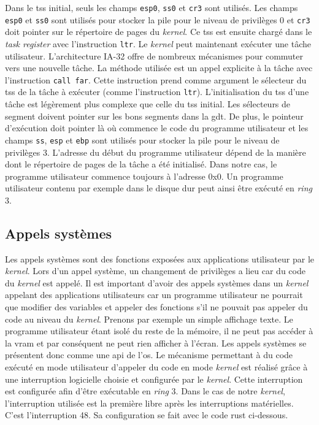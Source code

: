 Dans le \acrshort{tss} initial, seuls les champs \texttt{esp0},
\texttt{ss0} et \texttt{cr3} sont utilisés. Les champs
\texttt{esp0} et \texttt{ss0} sont utilisés pour stocker
la pile pour le niveau de privilèges 0 et \texttt{cr3} doit pointer
sur le répertoire de pages du \textit{kernel}. Ce \acrshort{tss} est ensuite chargé
dans le \textit{task register} avec l'instruction \texttt{ltr}. Le
\textit{kernel} peut maintenant exécuter une tâche utilisateur. L'architecture
\acrshort{IA-32} offre de nombreux mécanismes pour commuter vers une nouvelle
tâche. La méthode utilisée est un appel explicite à la tâche avec l'instruction
\texttt{call far}. Cette instruction prend comme argument le sélecteur
du \acrshort{tss} de la tâche à exécuter (comme l'instruction \texttt{ltr}).
L'initialisation du \acrshort{tss} d'une tâche est légèrement plus complexe que
celle du \acrshort{tss} initial. Les sélecteurs de segment doivent pointer sur les
bons segments dans la \acrshort{gdt}. De plus, le pointeur d'exécution doit
pointer là où commence le code du programme utilisateur et les champs \texttt{ss},
\texttt{esp} et \texttt{ebp} sont utilisés pour stocker la pile
pour le niveau de privilèges 3. L'adresse du début du programme utilisateur dépend
de la manière dont le répertoire de pages de la tâche a été initialisé. Dans notre
cas, le programme utilisateur commence toujours à l'adresse 0x0. Un programme
utilisateur contenu par exemple dans le disque dur peut ainsi être exécuté en
\textit{ring} 3.


\subsection{Appels systèmes}
Les appels systèmes sont des fonctions exposées aux applications utilisateur par
le \textit{kernel}. Lors d'un appel système, un changement de privilèges a lieu
car du code du \textit{kernel} est appelé. Il est important d'avoir des appels
systèmes dans un \textit{kernel} appelant des applications utilisateurs car
un programme utilisateur ne pourrait que modifier des variables et appeler des
fonctions s'il ne pouvait pas appeler du code au niveau du \textit{kernel}. Prenons
par exemple un simple affichage texte. Le programme utilisateur étant isolé du reste
de la mémoire, il ne peut pas accéder à la \acrshort{vram} et par conséquent ne
peut rien afficher à l'écran. Les appels systèmes se présentent donc comme une
\acrshort{api} de l'\acrshort{os}. Le mécanisme permettant à du code exécuté en
mode utilisateur d'appeler du code en mode \textit{kernel}
est réalisé grâce à une interruption logicielle choisie et configurée par le \textit{kernel}.
Cette interruption est configurée afin d'être exécutable en \textit{ring} 3.
Dans le cas de notre \textit{kernel}, l'interruption utilisée est la première libre
après les interruptions matérielles. C'est l'interruption 48. Sa configuration se
fait avec le code rust ci-dessous.

